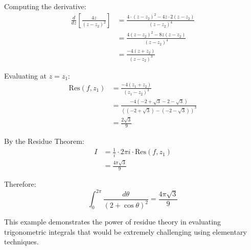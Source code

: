 \begin{example}
\begin{solution}
\noindent Computing the derivative:
\begin{align*}
\frac{d}{dz}\left[\frac{4z}{(z - z_2)^2}\right] &= \frac{4 \cdot (z - z_2)^2 - 4z \cdot 2(z - z_2)}{(z - z_2)^4} \\
&= \frac{4(z - z_2)^2 - 8z(z - z_2)}{(z - z_2)^4} \\
&= \frac{-4(z + z_2)}{(z - z_2)^3}
\end{align*}

\noindent Evaluating at $z = z_1$:
\begin{align*}
\text{Res}(f, z_1) &= \frac{-4(z_1 + z_2)}{(z_1 - z_2)^3} \\
&= \frac{-4(-2 + \sqrt{3} - 2 - \sqrt{3})}{((-2 + \sqrt{3}) - (-2 - \sqrt{3}))^3} \\
&= \frac{2\sqrt{3}}{9}
\end{align*}

\noindent By the Residue Theorem:
\begin{align*}
I &= \frac{1}{i} \cdot 2\pi i \cdot \text{Res}(f, z_1) \\
&= \frac{4\pi\sqrt{3}}{9}
\end{align*}

\noindent Therefore:
\[
\int_{0}^{2\pi} \frac{d\theta}{(2 + \cos\theta)^2} = \frac{4\pi\sqrt{3}}{9}
\]

\noindent This example demonstrates the power of residue theory in evaluating trigonometric integrals that would be extremely challenging using elementary techniques.
\end{solution}
\end{example}
\exampleline


\newpage

\formsdefs{}

